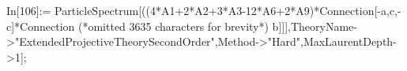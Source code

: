In[106]:= ParticleSpectrum[((4*A1+2*A2+3*A3-12*A6+2*A9)*Connection[-a,c,-c]*Connection (*omitted 3635 characters for brevity*) b]]],TheoryName->"ExtendedProjectiveTheorySecondOrder",Method->"Hard",MaxLaurentDepth->1];